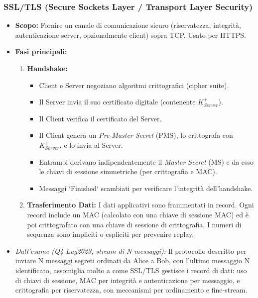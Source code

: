 \subsubsection{SSL/TLS (Secure Sockets Layer / Transport Layer Security)}
\begin{itemize}
    \item \textbf{Scopo:} Fornire un canale di comunicazione sicuro (riservatezza, integrità, autenticazione server, opzionalmente client) sopra TCP. Usato per HTTPS.
    \item \textbf{Fasi principali:}
    \begin{enumerate}
        \item \textbf{Handshake:}
        \begin{itemize}
            \item Client e Server negoziano algoritmi crittografici (cipher suite).
            \item Il Server invia il suo certificato digitale (contenente $K_{Server}^+$).
            \item Il Client verifica il certificato del Server.
            \item Il Client genera un \textit{Pre-Master Secret} (PMS), lo crittografa con $K_{Server}^+$, e lo invia al Server.
            \item Entrambi derivano indipendentemente il \textit{Master Secret} (MS) e da esso le chiavi di sessione simmetriche (per crittografia e MAC).
            \item Messaggi `Finished` scambiati per verificare l'integrità dell'handshake.
        \end{itemize}
        \item \textbf{Trasferimento Dati:} I dati applicativi sono frammentati in record. Ogni record include un MAC (calcolato con una chiave di sessione MAC) ed è poi crittografato con una chiave di sessione di crittografia. I numeri di sequenza sono impliciti o espliciti per prevenire replay.
    \end{enumerate}
    \item \emph{Dall'esame (Q4 Lug2023, stream di N messaggi):} Il protocollo descritto per inviare N messaggi segreti ordinati da Alice a Bob, con l'ultimo messaggio N identificato, assomiglia molto a come SSL/TLS gestisce i record di dati: uso di chiavi di sessione, MAC per integrità e autenticazione per messaggio, e crittografia per riservatezza, con meccanismi per ordinamento e fine-stream.
\end{itemize}

